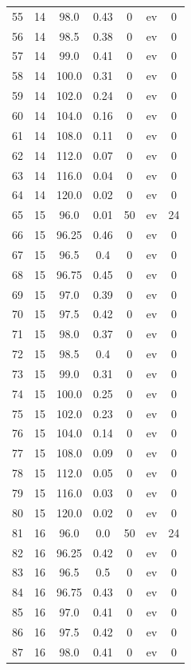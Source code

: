\documentclass[12pt,a4paper]{article}
\begin{document}
\begin{tabular}{r|cccccc}
	55 & 14 & 98.0 & 0.43 & 0 & ev & 0 \\
	56 & 14 & 98.5 & 0.38 & 0 & ev & 0 \\
	57 & 14 & 99.0 & 0.41 & 0 & ev & 0 \\
	58 & 14 & 100.0 & 0.31 & 0 & ev & 0 \\
	59 & 14 & 102.0 & 0.24 & 0 & ev & 0 \\
	60 & 14 & 104.0 & 0.16 & 0 & ev & 0 \\
	61 & 14 & 108.0 & 0.11 & 0 & ev & 0 \\
	62 & 14 & 112.0 & 0.07 & 0 & ev & 0 \\
	63 & 14 & 116.0 & 0.04 & 0 & ev & 0 \\
	64 & 14 & 120.0 & 0.02 & 0 & ev & 0 \\
	65 & 15 & 96.0 & 0.01 & 50 & ev & 24 \\
	66 & 15 & 96.25 & 0.46 & 0 & ev & 0 \\
	67 & 15 & 96.5 & 0.4 & 0 & ev & 0 \\
	68 & 15 & 96.75 & 0.45 & 0 & ev & 0 \\
	69 & 15 & 97.0 & 0.39 & 0 & ev & 0 \\
	70 & 15 & 97.5 & 0.42 & 0 & ev & 0 \\
	71 & 15 & 98.0 & 0.37 & 0 & ev & 0 \\
	72 & 15 & 98.5 & 0.4 & 0 & ev & 0 \\
	73 & 15 & 99.0 & 0.31 & 0 & ev & 0 \\
	74 & 15 & 100.0 & 0.25 & 0 & ev & 0 \\
	75 & 15 & 102.0 & 0.23 & 0 & ev & 0 \\
	76 & 15 & 104.0 & 0.14 & 0 & ev & 0 \\
	77 & 15 & 108.0 & 0.09 & 0 & ev & 0 \\
	78 & 15 & 112.0 & 0.05 & 0 & ev & 0 \\
	79 & 15 & 116.0 & 0.03 & 0 & ev & 0 \\
	80 & 15 & 120.0 & 0.02 & 0 & ev & 0 \\
	81 & 16 & 96.0 & 0.0 & 50 & ev & 24 \\
	82 & 16 & 96.25 & 0.42 & 0 & ev & 0 \\
	83 & 16 & 96.5 & 0.5 & 0 & ev & 0 \\
	84 & 16 & 96.75 & 0.43 & 0 & ev & 0 \\
	85 & 16 & 97.0 & 0.41 & 0 & ev & 0 \\
	86 & 16 & 97.5 & 0.42 & 0 & ev & 0 \\
	87 & 16 & 98.0 & 0.41 & 0 & ev & 0 \\

\end{tabular}
\end{document}
